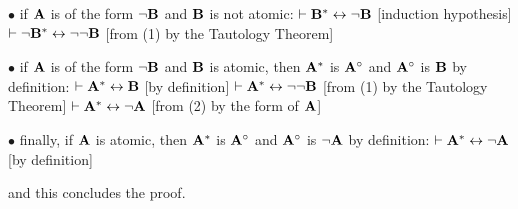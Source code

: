 \item{$\bullet$} if ${\bf A}$ is of the form $\neg{\bf B}$ and ${\bf B}$ is not atomic:
 $\vdash {\bf B}^* \leftrightarrow \neg {\bf B}$ \hfill [induction hypothesis]
 $\vdash \neg{\bf B}^* \leftrightarrow \neg\neg {\bf B}$ \hfill [from (1) by the Tautology Theorem]

\item{$\bullet$} if ${\bf A}$ is of the form $\neg{\bf B}$ and ${\bf B}$ is atomic, then 
${\bf A}^*$ is ${\bf A}^\circ$ and ${\bf A}^\circ$ is ${\bf B}$ by definition:
 $\vdash {\bf A}^* \leftrightarrow {\bf B}$ \hfill [by definition]
 $\vdash {\bf A}^* \leftrightarrow \neg\neg{\bf B}$ \hfill [from (1) by the Tautology Theorem]
 $\vdash {\bf A}^* \leftrightarrow \neg{\bf A}$ \hfill [from (2) by the form of ${\bf A}$]

\item{$\bullet$} finally, if ${\bf A}$ is atomic, then 
${\bf A}^*$ is ${\bf A}^\circ$ and ${\bf A}^\circ$ is $\neg{\bf A}$ by definition:
 $\vdash {\bf A}^* \leftrightarrow \neg{\bf A}$ \hfill [by definition]

and this concludes the proof.

\vfill
\break
